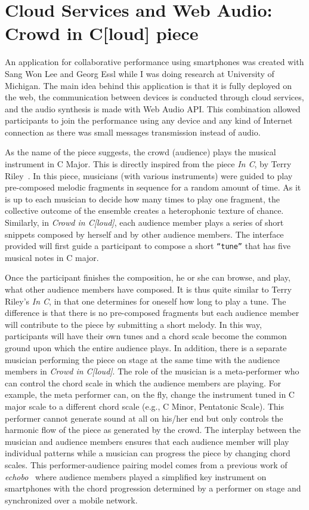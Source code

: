 \section{Cloud Services and Web Audio: Crowd in C[loud] piece}
\label{sec:appcrowdincloud}

An application for collaborative performance using smartphones was created with Sang Won Lee and Georg Essl while I was doing research at University of Michigan.
The main idea behind this application is that it is fully deployed on the web, the communication between devices is conducted through cloud services, and the audio synthesis is made with Web Audio API.
This combination allowed participants to join the performance using any device and any kind of Internet connection as there was small messages transmission instead of audio.

As the name of the piece suggests, the crowd (audience) plays the musical instrument in C Major. 
This is directly inspired from the piece \textit{In C}, by Terry Riley~\citep{Riley1964inc}. 
In this piece, musicians (with various instruments) were guided to play pre-composed melodic fragments in sequence for a random amount of time. 
As it is up to each musician to decide how many times to play one fragment, the collective outcome of the ensemble creates a heterophonic texture of chance.
Similarly, in \textit{Crowd in C[loud]}, each audience member plays a series of short snippets composed by herself and by other audience members.
The interface provided will first guide a participant to compose a short \texttt{``tune''} that has five musical notes in C major.

Once the participant finishes the composition, he or she can browse, and play, what other audience members have composed. 
It is thus quite similar to Terry Riley's \textit{In C}, in that one determines for oneself how long to play a tune. 
The difference is that there is no pre-composed fragments but each audience member will contribute to the piece by submitting a short melody.
In this way, participants will have their own tunes and a chord scale become the common ground upon which the entire audience plays. 
In addition, there is a separate musician performing the piece on stage at the same time with the audience members in \textit{Crowd in C[loud]}.
The role of the musician is a meta-performer who can control the chord scale in which the audience members are playing.
For example, the meta performer can, on the fly, change the instrument tuned in C major scale to a different chord scale (e.g., C Minor, Pentatonic Scale). 
This performer cannot generate sound at all on his/her end but only controls the harmonic flow of the piece as generated by the crowd.
The interplay between the musician and audience members ensures that each audience member will play individual patterns while a musician can progress the piece by changing chord scales. 
This performer-audience pairing model comes from a previous work of \textit{echobo}~\citep{Lee2013echobo} where audience members played a simplified key instrument on smartphones with the chord progression determined by a performer on stage and synchronized over a mobile network.

